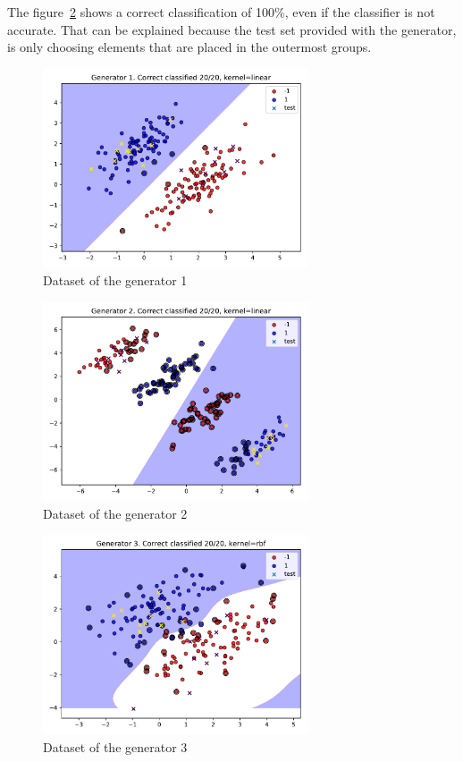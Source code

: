 \documentclass[12pt,a4paper]{article}
\begin{document}
The figure~\ref{fig:ex1gen2} shows a correct classification of 100\%, even if 
the classifier is not accurate. That can be explained because the test set 
provided with the generator, is only choosing elements that are placed in the 
outermost groups.
%
\begin{figure}[h]
	\centering
	\includegraphics[width=0.7\textwidth]{ex1/1.pdf}
	\caption{Dataset of the generator 1}
	\label{fig:ex1gen1}
\end{figure}
\begin{figure}[h]
	\centering
	\includegraphics[width=0.7\textwidth]{ex1/2.pdf}
	\caption{Dataset of the generator 2}
	\label{fig:ex1gen2}
\end{figure}
\begin{figure}[h]
	\centering
	\includegraphics[width=0.7\textwidth]{ex1/3.pdf}
	\caption{Dataset of the generator 3}
	\label{fig:ex1gen3}
\end{figure}
\end{document}

